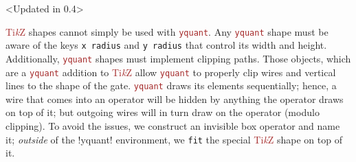 \documentclass{scrartcl}
\makeatletter
\newenvironment{codeexample*}{%
   \VerbatimEnvironment%
   \let\FVB@VerbatimOut\minted@FVB@VerbatimOut
   \let\FVE@VerbatimOut\minted@FVE@VerbatimOut
   \minted@configlang{tex}%
   \minted@fvset
   \begin{VerbatimOut}[codes={\catcode`\^^I=12},firstline,lastline]{\minted@jobname.pyg}%
}{
   \end{VerbatimOut}%
   \minted@langlinenoson%
   \begin{adjustbox}{center}
       \minted@jobname.pyg %
   \end{adjustbox}\nopagebreak
   \minted@pygmentize{\minted@lang}%
   \minted@langlinenosoff%
   \par%
}
\def\TikZ{\textcolor{brown}{Ti\textit kZ}}
\def\pkg#1{\textcolor{brown}{\texttt{#1}}}
\def\Yquant{\pkg{yquant}}
\makeatother
\begin{document}
               \begin{example}<Updated in 0.4>
                  \begin{codeexample*}
                  \end{codeexample*}
                  \TikZ{} shapes cannot simply be used with \Yquant.
                  Any \Yquant{} shape must be aware of the keys \texttt{x radius} and \texttt{y radius} that control its width and height.
                  Additionally, \Yquant{} shapes must implement clipping paths.
                  Those objects, which are a \Yquant{} addition to \TikZ{} allow \Yquant{} to properly clip wires and vertical lines to the shape of the gate.
                  \Yquant{} draws its elements sequentially; hence, a wire that comes into an operator will be hidden by anything the operator draws on top of it; but outgoing wires will in turn draw on the operator (modulo clipping).
                  To avoid the issues, we construct an invisible box operator and name it; \emph{outside} of the \tex!yquant! environment, we \texttt{fit} the special \TikZ{} shape on top of it.
               \end{example}
\end{document}
